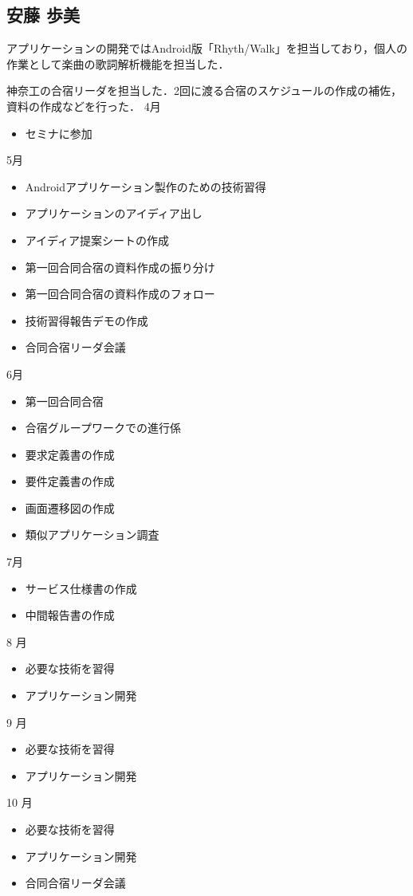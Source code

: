 \subsection{安藤 歩美}
\par アプリケーションの開発ではAndroid版「Rhyth/Walk」を担当しており，個人の作業として楽曲の歌詞解析機能を担当した．
\par 神奈工の合宿リーダを担当した．2回に渡る合宿のスケジュールの作成の補佐，資料の作成などを行った．
4月
\begin{itemize}
\item セミナに参加
\end{itemize}
5月
\begin{itemize}
\item Androidアプリケーション製作のための技術習得
\item アプリケーションのアイディア出し
\item アイディア提案シートの作成
\item 第一回合同合宿の資料作成の振り分け
\item 第一回合同合宿の資料作成のフォロー
\item 技術習得報告デモの作成
\item 合同合宿リーダ会議
\end{itemize}
6月
\begin{itemize}
\item 第一回合同合宿
\item 合宿グループワークでの進行係
\item 要求定義書の作成
\item 要件定義書の作成
\item 画面遷移図の作成
\item 類似アプリケーション調査
\end{itemize}
7月
\begin{itemize}
\item サービス仕様書の作成
\item 中間報告書の作成
\end{itemize}
8 月
\begin{itemize}
\item 必要な技術を習得
\item アプリケーション開発
\end{itemize}
9 月
\begin{itemize}
\item 必要な技術を習得
\item アプリケーション開発
\end{itemize}
10 月
\begin{itemize}
\item 必要な技術を習得
\item アプリケーション開発
\item 合同合宿リーダ会議
\end{itemize}
